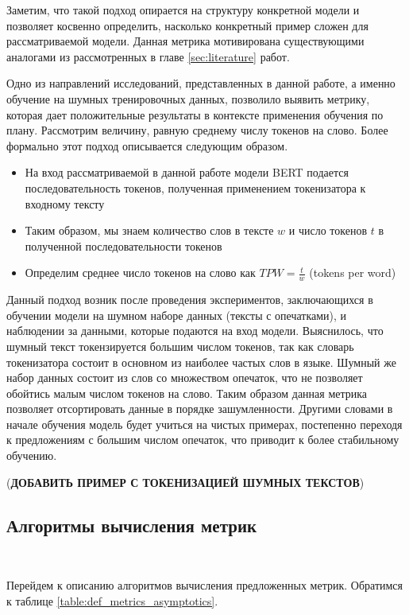 \documentclass{spbau-diploma}
\begin{document}
Заметим, что такой подход опирается на структуру конкретной модели и позволяет косвенно определить, насколько конкретный пример сложен для рассматриваемой модели. Данная метрика мотивирована существующими аналогами из рассмотренных в главе \ref{sec:literature} работ.

Одно из направлений исследований, представленных в данной работе, а именно обучение на шумных тренировочных данных, позволило выявить метрику, которая дает положительные результаты в контексте применения обучения по плану. Рассмотрим величину, равную среднему числу токенов на слово. Более формально этот подход описывается следующим образом.

\begin{itemize}
	\item На вход рассматриваемой в данной работе модели BERT подается последовательность токенов, полученная применением токенизатора к входному тексту
	\item Таким образом, мы знаем количество слов в тексте $w$ и число токенов $t$ в полученной последовательности токенов
	\item Определим среднее число токенов на слово как $TPW=\frac{t}{w}$ (tokens per word)
\end{itemize}

Данный подход возник после проведения экспериментов, заключающихся в обучении модели на шумном наборе данных (тексты с опечатками), и наблюдении за данными, которые подаются на вход модели. Выяснилось, что шумный текст токензируется большим числом токенов, так как словарь токенизатора состоит в основном из наиболее частых слов в языке. Шумный же набор данных состоит из слов со множеством опечаток, что не позволяет обойтись малым числом токенов на слово. Таким образом данная метрика позволяет отсортировать данные в порядке зашумленности. Другими словами в начале обучения модель будет учиться на чистых примерах, постепенно переходя к предложениям с большим числом опечаток, что приводит к более стабильному обучению.

({\bf ДОБАВИТЬ ПРИМЕР С ТОКЕНИЗАЦИЕЙ ШУМНЫХ ТЕКСТОВ})

\subsection{Алгоритмы вычисления метрик}
\ 

Перейдем к описанию алгоритмов вычисления предложенных метрик. Обратимся к таблице \ref{table:def_metrics_asymptotics}.
\end{document}
